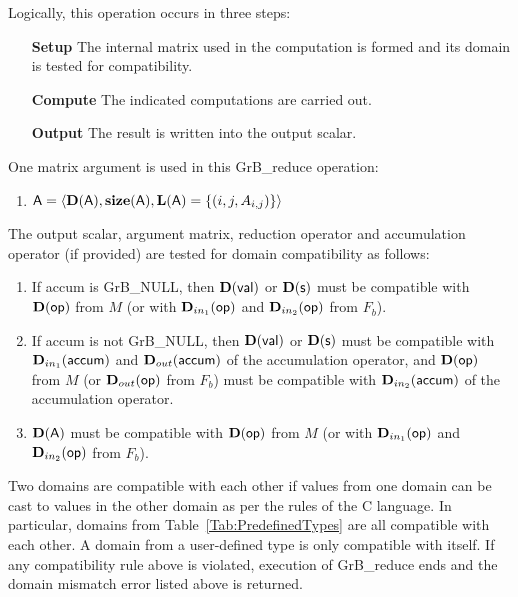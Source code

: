 Logically, this operation occurs in three steps:
\begin{enumerate}[leftmargin=0.85in]
\item[\bf Setup] The internal matrix used in the computation is formed 
and its domain is tested for compatibility.
\item[\bf Compute] The indicated computations are carried out.
\item[\bf Output] The result is written into the output scalar.
\end{enumerate}

One matrix argument is used in this {\sf GrB\_reduce} operation:
\begin{enumerate}
	\item ${\sf A} = \langle \bold{D}({\sf A}),\bold{size}({\sf A}),
    \bold{L}({\sf A}) = \{(i,j,A_{i,j}) \} \rangle$
\end{enumerate}

The output scalar, argument matrix, reduction operator and accumulation 
operator (if provided) are tested for domain compatibility as follows:
\begin{enumerate}

	\item If {\sf accum} is {\sf GrB\_NULL}, then $\bold{D}({\sf val})$ or $\bold{D}({\sf s})$ must be
    compatible with $\bold{D}({\sf op})$ from $M$ {\color{red} (or with $\mbox{$\mathbf{D}_{in_{1}}$}({\sf op})$ and 
    $\mbox{$\mathbf{D}_{in_{2}}$}({\sf op})$ from $F_b$)}.

	\item If {\sf accum} is not {\sf GrB\_NULL}, then $\bold{D}({\sf val})$ or $\bold{D}({\sf s})$ must be
    compatible with $\mbox{$\mathbf{D}_{in_{1}}$}({\sf accum})$ and $\mbox{$\mathbf{D}_{out}$}({\sf accum})$ of the accumulation operator, and 
    $\bold{D}({\sf op})$ from $M$ {\color{red} (or $\mbox{$\mathbf{D}_{out}$}({\sf op})$ from $F_b$)} must be compatible 
    with $\mbox{$\mathbf{D}_{in_{2}}$}({\sf accum})$ of the accumulation operator.

	\item $\bold{D}({\sf A})$ must be compatible with $\bold{D}({\sf op})$ from $M$ {\color{red} 
    (or with $\mbox{$\mathbf{D}_{in_{1}}$}({\sf op})$ and $\mbox{$\mathbf{D}_{in_{2}}$}({\sf op})$ from $F_b$)}.
\end{enumerate}
Two domains are compatible with each other if values from one domain can be cast 
to values in the other domain as per the rules of the C language.
In particular, domains from Table~\ref{Tab:PredefinedTypes} are all compatible 
with each other. A domain from a user-defined type is only compatible with itself.
If any compatibility rule above is violated, execution of {\sf GrB\_reduce} ends and 
the domain mismatch error listed above is returned.

